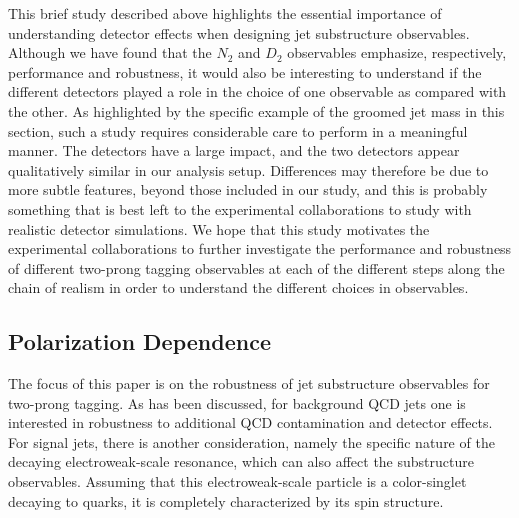 \documentclass[11pt]{cernrep}
\begin{document}
This brief study described above highlights the essential importance
of understanding detector effects when designing jet substructure
observables.
%
Although we have found that the $N_2$ and $D_2$ observables emphasize,
respectively, performance and robustness, it would also be interesting
to understand if the different detectors played a role in the choice
of one observable as compared with the other.
%
As highlighted by the specific example of the groomed jet mass in this section, such a study requires considerable care to perform in a meaningful manner.
%
The detectors have a large impact, and the two detectors appear qualitatively similar in our analysis setup.
%
Differences may therefore be due to more subtle features, beyond those included in our study, and this is probably something that is best left to the experimental collaborations to study with realistic detector simulations.
%
We hope that this study motivates the experimental collaborations to further investigate the performance and robustness of different two-prong tagging observables at each of the different steps along the chain of realism in order to understand the different choices in observables.



\subsection{Polarization Dependence}\label{jetsub_2prong_sec:polar}

The focus of this paper is on the robustness of jet substructure
observables for two-prong tagging.
%
As has been discussed, for
background QCD jets one is interested in robustness to additional QCD
contamination and detector effects.
%
For signal jets, there is another consideration, namely the specific nature of the decaying electroweak-scale resonance, which can also affect the substructure observables.
%
Assuming that this electroweak-scale particle is a color-singlet decaying to quarks, it is completely
characterized by its spin structure.
\end{document}
